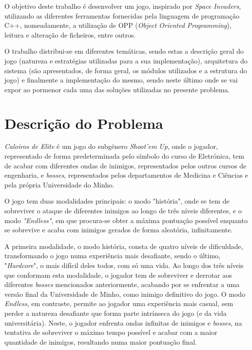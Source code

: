 \documentclass[a4paper,11pt]{article}
\newcommand\tab[1][0.8cm]{\hspace*{#1}}
\begin{document}
\vspace{8pt}

O objetivo deste trabalho é desenvolver um jogo, inspirado por \textit{Space Invaders}, utilizando as diferentes ferramentas fornecidas pela linguagem de programação C++, nomeadamente, a utilização de OPP (\textit{Object Oriented Programming}), leitura e alteração de ficheiros, entre outros.

\vspace{8pt}

O trabalho distribui-se em diferentes temáticas, sendo estas a descrição geral do jogo (natureza e estratégias utilizadas para a sua implementação),  arquitetura do sistema (são apresentados, de forma geral, os módulos utilizados e a estrutura do jogo) e finalmente a implementação do mesmo, sendo neste último onde se vai expor ao pormenor cada uma das soluções utilizadas no presente problema.

\pagebreak

\section{Descrição do Problema}

\vspace{8pt}

\tab
\textit{Caloiros de Elite} é um jogo do subgénero \textit{Shoot'em Up}, onde o jogador, representado de forma predeterminada pelo símbolo do curso de Eletrónica, tem de acabar com diferentes ondas de inimigos, representados pelos outros cursos de engenharia, e \textit{bosses}, representados pelos departamentos de Medicina e Ciências e pela própria Universidade do Minho.

\vspace{8pt}

O jogo tem duas modalidades principais: o modo "história", onde se tem de sobreviver o ataque de diferentes inimigos ao longo de três níveis diferentes, e o modo \textit{"Endless"}, em que procura-se obter a máxima pontuação possível enquanto se sobrevive e acaba com inimigos gerados de forma aleatória, infinitamente.

\vspace{8pt}

A primeira modalidade, o modo história, consta de quatro níveis de dificuldade, transformando o jogo numa experiência mais desafiante, sendo o último, "\textit{Hardcore}", o mais difícil deles todos, com só uma vida. Ao longo dos três níveis que conformam esta modalidade, o jogador tem de sobreviver e derrotar aos diferentes \textit{bosses} mencionados anteriormente, acabando por se enfrentar a uma versão final da Universidade de Minho, como inimigo definitivo do jogo. O modo \textit{Endless}, em contraste, permite ao jogador uma experiência mais casual, sem perder a natureza desafiante que forma parte intrínseca do jogo (e da vida universitária). Neste, o jogador enfrenta ondas infinitas de inimigos e \textit{bosses}, na tentativa de sobreviver o máximo tempo possível e acabar com a maior quantidade de inimigos, resultando numa maior pontuação final.
\end{document}
